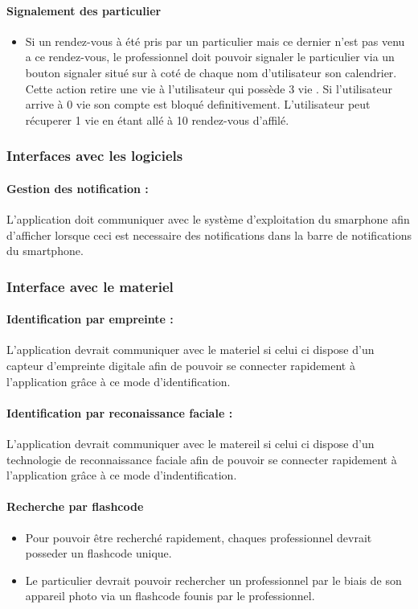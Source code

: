 \documentclass{article}
\begin{document}
\begin{itemize}
\paragraph{Signalement des particulier}
\begin{itemize}
\item Si un rendez-vous à été pris par un particulier mais ce dernier
  n'est pas venu a ce rendez-vous, le professionnel doit pouvoir
  signaler le particulier via un bouton \og signaler \fg{} situé sur
  à coté de chaque nom d'utilisateur son calendrier. Cette action retire une \og vie \fg{} à l'utilisateur qui possède
  3 \og vie \fg{}. Si l'utilisateur arrive à 0 vie son compte est
  bloqué definitivement. L'utilisateur peut récuperer 1 vie en étant
  allé à 10 rendez-vous d'affilé.
\end{itemize}

\subsubsection{Interfaces avec les logiciels}
\paragraph{Gestion des notification :}
L'application doit communiquer avec le système d'exploitation du
smarphone afin d'afficher lorsque ceci est necessaire des
notifications dans la barre de notifications du smartphone.

\subsubsection{Interface avec le materiel}
\paragraph{Identification par empreinte :}
L'application devrait communiquer avec le materiel si celui ci dispose
d'un capteur d'empreinte digitale afin de pouvoir se connecter rapidement à
l'application grâce à ce mode d'identification.
\paragraph{Identification par reconaissance faciale :}
L'application devrait communiquer avec le matereil si celui ci dispose
d'un technologie de reconnaissance faciale afin de pouvoir se
connecter rapidement à l'application grâce à ce mode
d'indentification.
\paragraph{Recherche par flashcode}
\begin{itemize}
\item Pour pouvoir être recherché rapidement, chaques professionnel
  devrait posseder un flashcode unique.
\item Le particulier devrait pouvoir rechercher un professionnel par le
  biais de son appareil photo via un flashcode founis par le
  professionnel.
\end{itemize}


\end{itemize}
\end{document}
